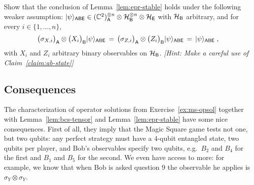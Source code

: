 \begin{exercise}
Show that the conclusion of Lemma~\ref{lem:epr-stable} holds under the following weaker assumption: $|\psi\rangle_{{\textsf{ABE}}} \in (\mathbb{C}^2)_{\textsf{A}}^{\otimes n} \otimes \mathcal{H}_{\textsf{B}}^{\otimes n} \otimes \mathcal{H}_{\textsf{E}}$ with $\mathcal{H}_{\textsf{B}}$ arbitrary, and for every $i\in \{1,\ldots, n\}$,
\[\big(\sigma_{X,i}\big)_{\textsf{A}} \otimes \big(X_i\big)_{\textsf{B}} |\psi\rangle_{{\textsf{ABE}}} \,=\, \big(\sigma_{Z,i}\big)_{\textsf{A}} \otimes \big(Z_i\big)_{\textsf{B}} |\psi\rangle_{{\textsf{ABE}}} \,=\,|\psi\rangle_{\textsf{ABE}}\;,\]
with $X_i$ and $Z_i$ arbitrary binary observables on $\mathcal{H}_{\textsf{B}}$. \emph{[Hint: Make a careful use of Claim~\ref{claim:ab-state}]}
\end{exercise}


\subsection{Consequences} 
\label{sec:spatial-consequences}

The characterization of operator solutions from Exercise~\ref{ex:ms-opsol} together with Lemma~\ref{lem:bcs-tensor} and Lemma~\ref{lem:epr-stable} have some nice consequences. First of all, they imply that the Magic Square game tests not one, but two qubits: any perfect strategy must have a $4$-qubit entangled state, two qubits per player, and Bob's observables specify two qubits, e.g.\ $B_2$ and $B_4$ for the first and $B_1$ and $B_5$ for the second. We even have access to more: for example, we know that when Bob is asked question $9$ the observable he applies is $\sigma_Y \otimes \sigma_Y$. 


